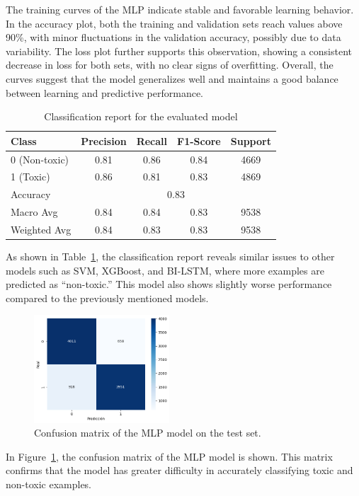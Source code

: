 The training curves of the MLP indicate stable and favorable learning behavior. In the accuracy plot, both the training and validation sets reach values above 90\%, with minor fluctuations in the validation accuracy, possibly due to data variability. The loss plot further supports this observation, showing a consistent decrease in loss for both sets, with no clear signs of overfitting. Overall, the curves suggest that the model generalizes well and maintains a good balance between learning and predictive performance.

\begin{table}[H]
    \centering
    \caption{Classification report for the evaluated model}
    \label{tab:mlp_classification_report}
    \begin{tabular}{lcccc}
        \toprule
        Class & Precision & Recall & F1-Score & Support \\
        \midrule
        0 (Non-toxic) & 0.81 & 0.86 & 0.84 & 4669 \\
        1 (Toxic)     & 0.86 & 0.81 & 0.83 & 4869 \\
        \midrule
        Accuracy      & \multicolumn{4}{c}{0.83} \\
        Macro Avg     & 0.84 & 0.84 & 0.83 & 9538 \\
        Weighted Avg  & 0.84 & 0.83 & 0.83 & 9538 \\
        \bottomrule
    \end{tabular}
\end{table}

As shown in Table~\ref{tab:mlp_classification_report}, the classification report reveals similar issues to other models such as SVM, XGBoost, and BI-LSTM, where more examples are predicted as “non-toxic.” This model also shows slightly worse performance compared to the previously mentioned models.

\begin{figure}[H]
    \centering
    \includegraphics[width=0.45\textwidth]{images/mlp_confusion_matrix.png}
    \caption{Confusion matrix of the MLP model on the test set.}
    \label{fig:mlp_confusion_matrix}
\end{figure}

In Figure~\ref{fig:mlp_confusion_matrix}, the confusion matrix of the MLP model is shown. This matrix confirms that the model has greater difficulty in accurately classifying toxic and non-toxic examples.